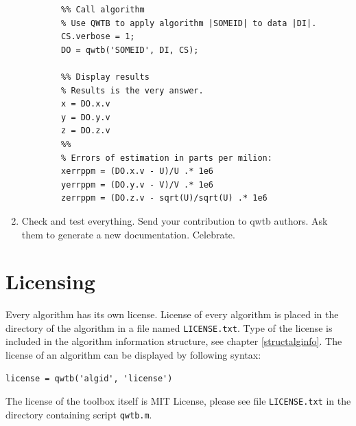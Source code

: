 \documentclass[12pt,a4paper,oneside]{report} %
\begin{document}
\begin{enumerate}
\begin{lstlisting}
        %% Call algorithm
        % Use QWTB to apply algorithm |SOMEID| to data |DI|.
        CS.verbose = 1;
        DO = qwtb('SOMEID', DI, CS);

        %% Display results
        % Results is the very answer.
        x = DO.x.v
        y = DO.y.v
        z = DO.z.v
        %%
        % Errors of estimation in parts per milion:
        xerrppm = (DO.x.v - U)/U .* 1e6
        yerrppm = (DO.y.v - V)/V .* 1e6
        zerrppm = (DO.z.v - sqrt(U)/sqrt(U) .* 1e6
        \end{lstlisting}

        \item Check and test everything. Send your contribution to qwtb authors. Ask them to
        generate a new documentation. Celebrate.

\end{enumerate}

\chapter{Licensing} %
\label{ch-license}
Every algorithm has its own license. License of every algorithm is placed in the directory of the
algorithm in a file named {\tt LICENSE.txt}. Type of the license is included in the algorithm information structure, see
chapter \ref{structalginfo}. The license of an algorithm can be displayed by following syntax:
\begin{lstlisting}
license = qwtb('algid', 'license')
\end{lstlisting}

The license of the toolbox itself is MIT License, please see file {\tt LICENSE.txt} in the directory
containing script {\tt qwtb.m}.

\printbibliography[title={Bilbiography},heading={bibnumbered}]
\end{document}
